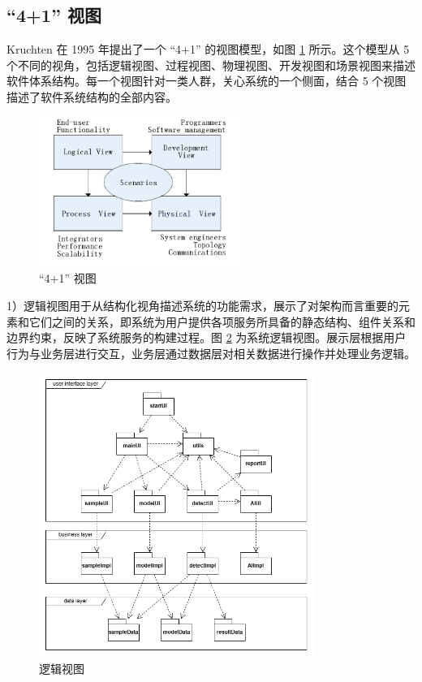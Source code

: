 \documentclass[
  ]{njuthesis}
\begin{document}
\subsection{“4+1” 视图}

Kruchten 在 1995 年提出了一个 “4+1” 的视图模型，如图 \ref{4+1视图} 所示。这个模型从 5 个不同的视角，包括逻辑视图、过程视图、物理视图、开发视图和场景视图来描述软件体系结构。每一个视图针对一类人群，关心系统的一个侧面，结合 5 个视图描述了软件系统结构的全部内容\cite{[11]}。

\begin{figure}[htb]
    \centering
    \includegraphics[width=0.6\textwidth]{images/4+1视图.png}
    \caption{“4+1” 视图}
    \label{4+1视图}
\end{figure}

1）逻辑视图用于从结构化视角描述系统的功能需求，展示了对架构而言重要的元素和它们之间的关系，即系统为用户提供各项服务所具备的静态结构、组件关系和边界约束，反映了系统服务的构建过程。图 \ref{逻辑视图} 为系统逻辑视图。展示层根据用户行为与业务层进行交互，业务层通过数据层对相关数据进行操作并处理业务逻辑。

\begin{figure}[H]
    \centering
    \includegraphics[width=0.8\textwidth]{images/逻辑视图.png}
    \caption{逻辑视图}
    \label{逻辑视图}
\end{figure}
\end{document}
